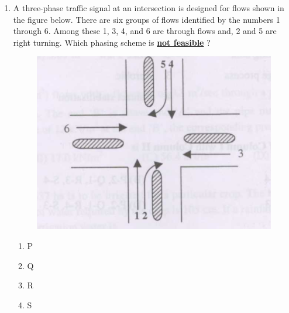 \documentclass[journal]{IEEEtran}
\begin{document}
\begin{enumerate}
\item A three-phase traffic signal at an intersection is designed for flows shown in the figure below. There are six groups of flows identified by the numbers 1 through 6. Among these 1, 3, 4, and 6 are through flows and, 2 and 5 are right turning. Which phasing scheme is \textbf{\underline{not feasible}} ?
 \begin{figure}[h!]
	    \centering
	    \includegraphics[width=0.5\linewidth]{figs/Q12.png}
	      \end{figure}
\begin{table}[h!]
  \centering
  
\end{table} 
\begin{enumerate}
    \item P
    \item Q
    \item R
    \item S \\
\end{enumerate}
			 \end{enumerate}
			 
\end{document}
